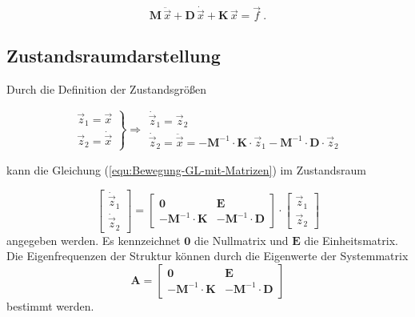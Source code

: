 	\begin{equation}\label{equ:Bewegung-GL-mit-Matrizen}
	\mathbf{M}\, \ddot{\vec{x}}+ \mathbf{D}\, \dot{\vec{x}}+ \mathbf{K}\, \vec{x} = \vec{f} \ .
	\end{equation}
	
	\subsection{Zustandsraumdarstellung}
	Durch die Definition der Zustandsgrößen
	
	\begin{equation}\label{equ:Ansatz-in-Systemmatrix}
	\left. 
	\begin{array}{c}
	\vec{z}_{1} = \vec{x} \\
	\vec{z}_{2} = \dot{\vec{x}}
	\end{array}
	\right\rbrace \Rightarrow	
	\begin{array}{l}
	\dot{\vec{z}}_{1} = \vec{z}_{2} \\
	\dot{\vec{z}}_{2} = \ddot{\vec{x}} = - \mathbf{M}^{-1} \cdot \mathbf{K} \cdot \vec{z}_{1} - \mathbf{M}^{-1} \cdot \mathbf{D} \cdot \vec{z}_{2}
	\end{array}
	\end{equation}
	
	kann die Gleichung (\ref{equ:Bewegung-GL-mit-Matrizen}) im Zustandsraum
	
	\begin{equation}\label{equ:1st-Ausgangspunkt}
	\left[ 
	\begin{array}{c}
	\dot{\vec{z}}_{1}\\
	\dot{\vec{z}}_{2}
	\end{array}
	\right] 
	=
	\left[ 
	\begin{array}{cc}
	\mathbf{0}                        & \mathbf{E} \\
	-\mathbf{M}^{-1} \cdot \mathbf{K} & -\mathbf{M}^{-1} \cdot \mathbf{D}
	\end{array}
	\right]
	\cdot
	\left[ 
	\begin{array}{c}
	\vec{z}_{1}\\
	\vec{z}_{2}
	\end{array}
	\right] 
	\end{equation}
	angegeben werden. Es kennzeichnet $\textbf{0}$ die Nullmatrix und $\textbf{E}$ die Einheitsmatrix. Die Eigenfrequenzen der Struktur können durch die Eigenwerte der Systemmatrix
	\begin{equation}\label{equ:Systemmatrix}
	\mathbf{A}
	=
	\left[ 
	\begin{array}{cc}
	\mathbf{0}                        & \mathbf{E} \\
	-\mathbf{M}^{-1} \cdot \mathbf{K} & -\mathbf{M}^{-1} \cdot \mathbf{D}
	\end{array}
	\right]
	\end{equation}
	bestimmt werden.\\
	

	